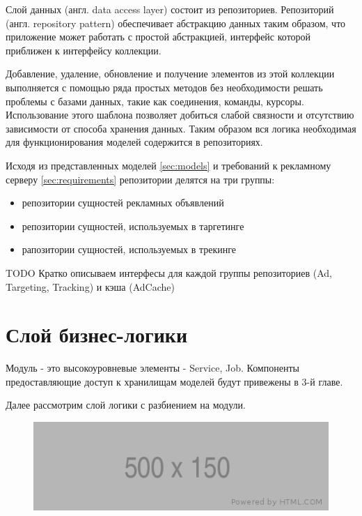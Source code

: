 \documentclass[times]{itmo-student-thesis}
\begin{document}
Слой данных (англ. data access layer) \cite{data-access-layer} состоит из репозиториев. Репозиторий (англ. repository pattern) \cite{repository-pattern} обеспечивает абстракцию данных таким образом, что приложение может работать с простой абстракцией, интерфейс которой приближен к интерфейсу коллекции. 

Добавление, удаление, обновление и получение элементов из этой коллекции выполняется с помощью ряда простых методов без необходимости решать проблемы с базами данных, такие как соединения, команды, курсоры. Использование этого шаблона позволяет добиться слабой связности и отсутствию зависимости от способа хранения данных. Таким образом вся логика необходимая для функционирования моделей содержится в репозиториях.

Исходя из представленных моделей \ref{sec:models} и требований к рекламному серверу \ref{sec:requirements} репозитории делятся на три группы:
\begin{itemize}
\item репозитории сущностей рекламных объявлений
\item репозитории сущностей, используемых в таргетинге
\item рапозитории сущностей, используемых в трекинге
\end{itemize}

TODO Кратко описываем интерфесы для каждой группы репозиториев (Ad, Targeting, Tracking) и кэша (AdCache)

\section{Слой бизнес-логики}

Модуль - это высокоуровневые элементы - Service, Job. Компоненты предоставляющие доступ к хранилищам моделей будут привежены в 3-й главе.

Далее рассмотрим слой логики с разбиением на модули.

\begin{figure}[h]
\includegraphics[width=\textwidth]{placeholder}
\centering
\end{figure}
\end{document}
